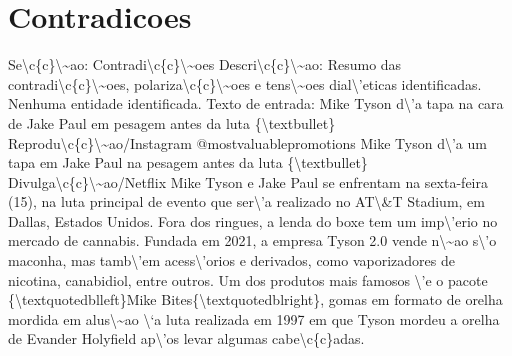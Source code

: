 \documentclass{article}%
\begin{document}
\section{Contradicoes}%
\label{sec:Contradicoes}%
Se\textbackslash{}c\{c\}\textbackslash{}\textasciitilde{}ao: Contradi\textbackslash{}c\{c\}\textbackslash{}\textasciitilde{}oes\newline%
Descri\textbackslash{}c\{c\}\textbackslash{}\textasciitilde{}ao: Resumo das contradi\textbackslash{}c\{c\}\textbackslash{}\textasciitilde{}oes, polariza\textbackslash{}c\{c\}\textbackslash{}\textasciitilde{}oes e tens\textbackslash{}\textasciitilde{}oes dial\textbackslash{}'eticas identificadas.\newline%
\newline%
Nenhuma entidade identificada.\newline%
\newline%
Texto de entrada:\newline%
Mike Tyson d\textbackslash{}'a tapa na cara de Jake Paul em pesagem antes da luta\newline%
\{\textbackslash{}textbullet\} Reprodu\textbackslash{}c\{c\}\textbackslash{}\textasciitilde{}ao/Instagram @mostvaluablepromotions\newline%
\newline%
Mike Tyson d\textbackslash{}'a um tapa em Jake Paul na pesagem antes da luta\newline%
\{\textbackslash{}textbullet\} Divulga\textbackslash{}c\{c\}\textbackslash{}\textasciitilde{}ao/Netflix\newline%
\newline%
Mike Tyson e Jake Paul se enfrentam na sexta{-}feira (15), na luta principal de evento que ser\textbackslash{}'a realizado no AT\textbackslash{}\&T Stadium, em Dallas, Estados Unidos. Fora dos ringues, a lenda do boxe tem um imp\textbackslash{}'erio no mercado de cannabis.\newline%
\newline%
Fundada em 2021, a empresa Tyson 2.0 vende n\textbackslash{}\textasciitilde{}ao s\textbackslash{}'o maconha, mas tamb\textbackslash{}'em acess\textbackslash{}'orios e derivados, como vaporizadores de nicotina, canabidiol, entre outros. Um dos produtos mais famosos \textbackslash{}'e o pacote \{\textbackslash{}textquotedblleft\}Mike Bites\{\textbackslash{}textquotedblright\}, gomas em formato de orelha mordida em alus\textbackslash{}\textasciitilde{}ao \textbackslash{}`a luta realizada em 1997 em que Tyson mordeu a orelha de Evander Holyfield ap\textbackslash{}'os levar algumas cabe\textbackslash{}c\{c\}adas.\newline%
\end{document}
